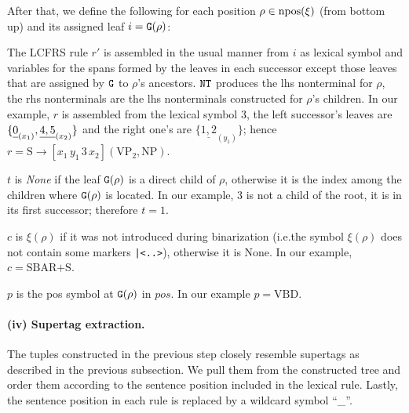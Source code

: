\documentclass[../../document.tex]{subfiles}
\begin{document}
    After that, we define the following for each position \(\rho \in \operatorname{npos}(\xi)\) (from bottom up) and its assigned leaf \(i = \texttt{G}(\rho)\):
    \begin{asparaitem}
        \item
        The LCFRS rule \(r'\) is assembled in the usual manner from \(i\) as lexical symbol and variables for the spans formed by the leaves in each successor except those leaves that are assigned by \(\texttt{G}\) to \(\rho\)'s ancestors.
        \(\texttt{NT}\) produces the lhs nonterminal for \(\rho\), the rhs nonterminals are the lhs nonterminals constructed for \(\rho\)'s children.
        In our example, \(r\) is assembled from the lexical symbol \(3\), the left successor's leaves are \(\{\underline{0\vphantom{,}}_{(x_1)}, \underline{4,5} _{(x_2)}\}\) and the right one's are \(\{\underline{1,2} _{(y_1)}\}\);
        hence \(r = \text{S} \to [x_1 \, y_1 \, 3 \, x_2] (\text{VP}_2, \text{NP})\).

        \item
        \(t\) is \emph{None} if the leaf \(\texttt{G}(\rho)\) is a direct child of \(\rho\), otherwise it is the index among the children where \(\texttt{G}(\rho)\) is located.
        In our example, 3 is not a child of the root, it is in its first successor; therefore \(t=1\).

        \item
        \(c\) is \(\xi(\rho)\) if it was not introduced during binarization (i.e.\@ the symbol \(\xi(\rho)\) does not contain some markers \texttt{|<..>}), otherwise it is None.
        In our example, \(c = \text{SBAR+S}\).

        \item
        \(p\) is the pos symbol at \(\texttt{G}(\rho)\) in \(\mathit{pos}\).
        In our example \(p = \text{VBD}\).
    \end{asparaitem}

    \paragraph{(iv) Supertag extraction.}
    The tuples constructed in the previous step closely resemble supertags as described in the previous subsection.
    We pull them from the constructed tree and order them according to the sentence position included in the lexical rule.
    Lastly, the sentence position in each rule is replaced by a wildcard symbol ``\_''.

    \ifSubfilesClassLoaded{%
        \printindex
    }{}
\end{document}

